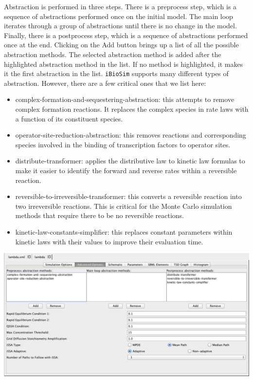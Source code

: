 \documentclass[titlepage,11pt]{article}
\begin{document}
\noindent
Abstraction is performed in three steps.  There is a preprocess step, which is a sequence of abstractions performed once on the initial model.  The main loop iterates through a group of abstractions until there is no change in the model.  Finally, there is a postprocess step, which is a sequence of abstractions performed once at the end.  Clicking on the Add button brings up a list of all the possible abstraction methods.  The selected abstraction method is added after the highlighted abstraction method in the list.  If no method is highlighted, it makes it the first abstraction in the list.
{\tt iBioSim} supports many different types of abstraction.  However, there are a few critical ones that we list here:
\begin{itemize}
\item complex-formation-and-sequestering-abstraction: this attempts to remove complex formation reactions.  It replaces the complex species in rate laws with a function of its constituent species.
\item operator-site-reduction-abstraction: this removes reactions and corresponding species involved in the binding of transcription factors to operator sites.
\item distribute-transformer: applies the distributive law to kinetic law formulas to make it easier to identify the forward and reverse rates within a reversible reaction.
\item reversible-to-irreversible-transformer: this converts a reversible reaction into two irreversible reactions.  This is critical for the Monte Carlo simulation methods that require there to be no reversible reactions.
\item kinetic-law-constants-simplifier: this replaces constant parameters within kinetic laws with their values to improve their evaluation time.
\end{itemize}

\begin{center}
\includegraphics[width=160mm]{screenshots/absOptions}
\end{center}
\end{document}
